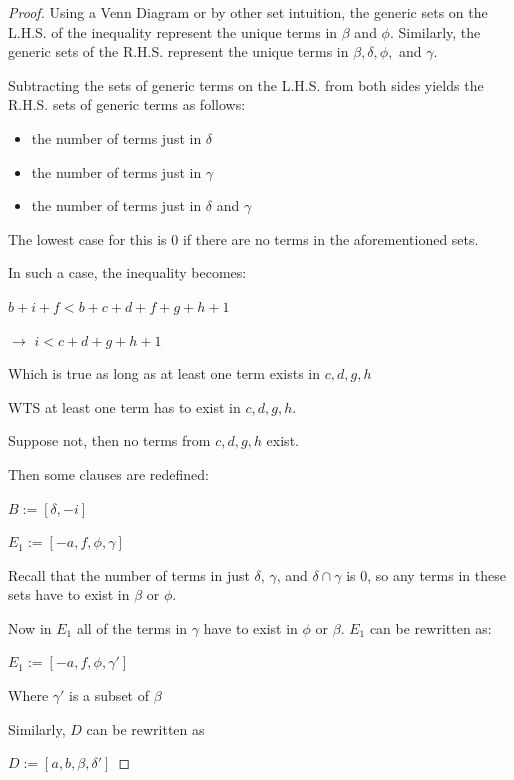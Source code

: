 \documentclass[manuscript]{acmart}
\begin{document}
\begin{proof}
        Using a Venn Diagram or by other set intuition, the generic sets on the
        L.H.S. of the inequality represent the unique terms in $\beta$ and $\phi$.
        Similarly, the generic sets of the R.H.S. represent the unique terms
        in $\beta, \delta, \phi,$ and $\gamma$. 

        Subtracting the sets of generic terms on the L.H.S. from both sides
        yields the R.H.S. sets of generic terms as follows: 
        
        \begin{itemize}
            \item the number of terms just in $\delta$
            \item the number of terms just in $\gamma$
            \item the number of terms just in $\delta$ and $\gamma$ 
        \end{itemize}

        The lowest case for this is 0 if there are no terms in the aforementioned sets.

        In such a case, the inequality becomes:

        $b + i + f < b + c + d + f + g + h + 1$

        $\rightarrow$ $i < c + d + g + h + 1$

        Which is true as long as at least one term exists in {$c, d, g, h$}

        WTS at least one term has to exist in {$c, d, g, h$}.

        Suppose not, then no terms from {$c, d, g, h$} exist.

        Then some clauses are redefined:

        $B := [\delta, -i]$

        $E_1 := [-a, f, \phi, \gamma]$
        
        Recall that the number of terms in just $\delta$, $\gamma$, and 
        $\delta \cap \gamma$ is 0, so any terms in these sets have
        to exist in $\beta$ or $\phi$.

        Now in $E_1$ all of the terms in $\gamma$ have to exist in $\phi$
        or $\beta$. $E_1$ can be rewritten as:

        $E_1 := [-a, f, \phi, \gamma']$

        Where $\gamma'$ is a subset of $\beta$

        Similarly, $D$ can be rewritten as 

        $D := [a, b, \beta, \delta']$


\end{proof}
\end{document}
